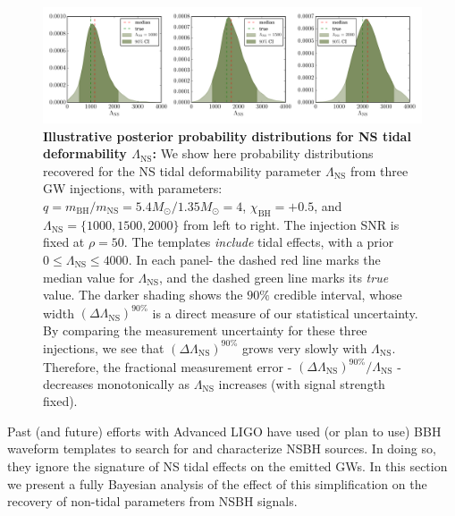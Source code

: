 \documentclass[aps,prd,amsmath,floats,floatfix, twocolumn,
superscriptaddress,nofootinbib,showpacs]{revtex4-1}
\newcommand{\lambdans}{\Lambda_\mathrm{NS}}
\newcommand{\chibh}{\chi_\mathrm{BH}}
\newcommand{\mbh}{m_\mathrm{BH}}
\newcommand{\mns}{m_\mathrm{NS}}
\begin{document}
%
% 
\begin{figure}
\centering 
\includegraphics[trim=10 20 8 18 0,clip=true,width=1.9\columnwidth]{SingleSystemLambdaVary_q4_0_mc2_25_chi0_50_snr50}
\caption{{\bf Illustrative posterior probability distributions for NS tidal
deformability $\lambdans$:}
We show here probability distributions recovered for the NS tidal
deformability parameter $\lambdans$ from three GW injections, with parameters:
$q = \mbh/\mns = 5.4M_\odot/1.35M_\odot = 4$, $\chibh=+0.5$, and 
$\lambdans=\{1000,1500,2000\}$ from left to right. The injection SNR is fixed at
$\rho=50$. The templates {\it include} tidal effects, with a prior $0\leq\lambdans\leq 4000$.
% 
In each panel- the dashed red line marks the median value for
$\lambdans$, and the dashed green line marks its {\it true} value.
The darker shading shows the $90\%$ credible interval, whose width
$(\Delta\lambdans)^{90\%}$ is a direct measure of our statistical uncertainty.
By comparing the measurement uncertainty for these three injections, we see
that $(\Delta\lambdans)^{90\%}$ grows very slowly with $\lambdans$. Therefore,
the fractional measurement error - $(\Delta\lambdans)^{90\%}/\lambdans$ -
decreases monotonically as $\lambdans$ increases (with signal strength fixed).
}
\label{fig:SingleSystemLambdaPDFvsSNR}
\end{figure}
% 
Past (and future) efforts with Advanced LIGO have used (or plan to use) BBH
waveform templates to search for and characterize NSBH sources. In doing so,
they ignore the signature of NS tidal effects on the emitted GWs. In this
section we present a fully Bayesian analysis of the effect of this
simplification on the recovery of non-tidal parameters from NSBH signals.
\end{document}
